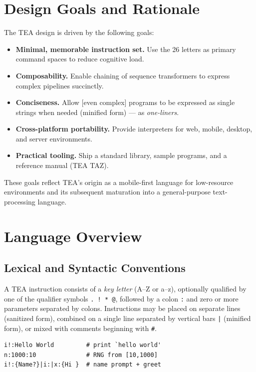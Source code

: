 \documentclass[acmtoplas]{acmart}
\begin{document}
\section{Design Goals and Rationale}
\label{SEC2}
The TEA design is driven by the following goals:

\begin{itemize}
  \item \textbf{Minimal, memorable instruction set.} Use the 26 letters as primary command spaces to reduce cognitive load.
  \item \textbf{Composability.} Enable chaining of sequence transformers \cite{Lutalo2025_transformatics_thesis} to express complex pipelines succinctly.
  \item \textbf{Conciseness.} Allow [even complex] programs to be expressed as single strings when needed (minified form) --- as \textit{one-liners}.
  \item \textbf{Cross-platform portability.} Provide interpreters for web, mobile, desktop, and server environments.
  \item \textbf{Practical tooling.} Ship a standard library, sample programs, and a reference manual (TEA TAZ).
\end{itemize}

These goals reflect TEA's origin as a mobile-first language for low-resource environments and its subsequent maturation into a general-purpose text-processing language.

\section{Language Overview}
\label{SEC3}

\subsection{Lexical and Syntactic Conventions}
A TEA instruction consists of a \emph{key letter} (A–Z or a–z), optionally qualified by one of the qualifier symbols \texttt{. ! * @}, followed by a colon \texttt{:} and zero or more parameters separated by colons. Instructions may be placed on separate lines (sanitized form), combined on a single line separated by vertical bars \texttt{|} (minified form), or mixed with comments beginning with \texttt{\#}.

\vspace{2em}

\begin{lstlisting}[style=tea,caption=Minimal TEA Program Examples,label=LST1] 
i!:Hello World         # print `hello world'
n:1000:10              # RNG from [10,1000]
i!:{Name?}|i:|x:{Hi }  # name prompt + greet
\end{lstlisting}
\end{document}
